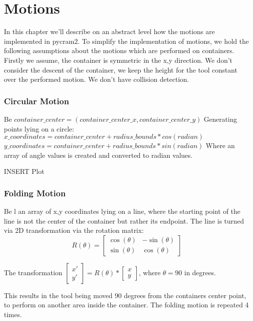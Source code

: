 \chapter*{Motions}

In this chapter we'll describe on an abstract level how the motions are implemented in pycram2.
To simplify the implementation of motions, we hold the following assumptions about the motions which are performed on containers.
Firstly we assume, the container is symmetric in the x,y direction. We don't consider the descent of the container, we keep the height for the tool
constant over the performed motion. We don't have collision detection.

\subsection*{Circular Motion}
Be $container\_center = (container\_center\_x, container\_center\_y)$
Generating points lying on a circle:
$x\_coordinates = container\_center + radius\_bounds * cos(radian)$
$y\_coordinates = container\_center + radius\_bounds * sin(radian)$
Where an array of angle values is created and converted to radian values. 

INSERT Plot

\subsection{Folding Motion}
Be l an array of x,y coordinates lying on a line, where the starting point of the line is not the center of the container but rather its endpoint.
The line is turned via 2D transformation via the rotation matrix: 
\[R(\theta) = \begin{bmatrix}
   \cos(\theta) & -\sin(\theta) \\
   \sin(\theta) & \cos(\theta)
    \end{bmatrix}
\]

The transformation $\begin{bmatrix} x' \\ y' \end{bmatrix} = R(\theta) * \begin{bmatrix} x \\ y \end{bmatrix}$, where 
$\theta=90$ in degrees. 

This results in the tool being moved 90 degrees from the containers center point, to perform on another area inside the container.
The folding motion is repeated 4 times. 

